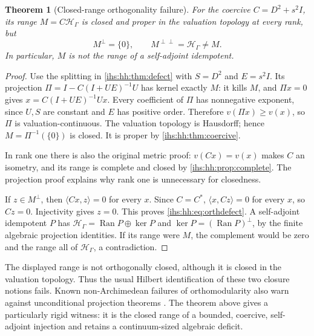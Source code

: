 \documentclass[11pt,a4paper]{article}
\numberwithin{equation}{section}
\newtheorem{theorem}{Theorem}[section]
\theoremstyle{definition}
\theoremstyle{remark}
\newcommand{\Hil}{\mathcal H_\Gamma}
\newcommand{\Ran}{\operatorname{Ran}}
\newcommand{\ip}[2]{\langle#1,#2\rangle}
\begin{document}
\begin{theorem}[Closed-range orthogonality failure]\label{ihs:hh:thm:closedrange}
For the coercive $C=D^2+s^2I$, its range $M=C\Hil$ is closed and proper in
the valuation topology at every rank, but
\begin{equation}\label{ihs:hh:eq:orthdefect}
 M^\perp=\{0\},\qquad M^{\perp\perp}=\Hil\ne M.
\end{equation}
In particular, $M$ is not the range of a self-adjoint idempotent.
\end{theorem}
\begin{proof}
Use the splitting in \cref{ihs:hh:thm:defect} with $S=D^2$ and $E=s^2I$.
Its projection $\Pi=I-C(I+UE)^{-1}U$ has kernel exactly $M$:
it kills $M$, and $\Pi x=0$ gives $x=C(I+UE)^{-1}Ux$.
Every coefficient of $\Pi$ has nonnegative exponent, since $U,S$ are
constant and $E$ has positive order. Therefore $v(\Pi x)\ge v(x)$,
so $\Pi$ is valuation-continuous. The valuation topology is Hausdorff;
hence $M=\Pi^{-1}(\{0\})$ is closed. It is proper by
\cref{ihs:hh:thm:coercive}.

In rank one there is also the original metric proof:
$v(Cx)=v(x)$ makes $C$ an isometry, and its range is complete and closed
by \cref{ihs:hh:prop:complete}. The projection proof explains why rank one
is unnecessary for closedness.

If $z\in M^\perp$, then $\ip{Cx}{z}=0$ for every $x$. Since $C=C^*$,
$\ip{x}{Cz}=0$ for every $x$, so $Cz=0$. Injectivity gives $z=0$. This
proves \eqref{ihs:hh:eq:orthdefect}. A self-adjoint idempotent $P$ has
$\Hil=\Ran P\oplus\ker P$ and $\ker P=(\Ran P)^\perp$, by the finite
algebraic projection identities. If its range were $M$, the complement would
be zero and the range all of $\Hil$, a contradiction.
\end{proof}

The displayed range is not orthogonally closed, although it is closed in the valuation
topology. Thus the usual Hilbert identification of these two closure notions
fails. Known non-Archimedean failures of orthomodularity also warn against
unconditional projection theorems \cite{AN,ANS}. The theorem above gives a
particularly rigid witness: it is the closed range of a bounded, coercive,
self-adjoint injection and retains a continuum-sized algebraic deficit.
\end{document}
